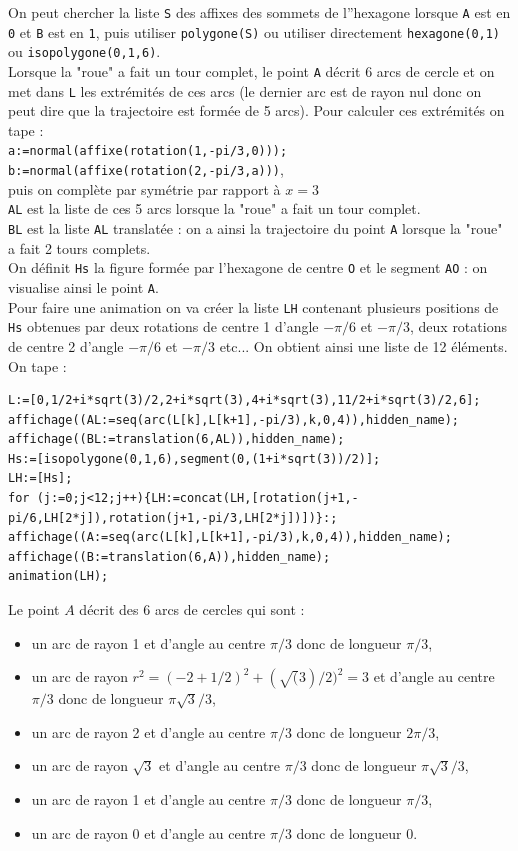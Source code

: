 \documentclass[a4paper,11pt]{book}
\begin{document}
On peut chercher la liste {\tt S} des affixes des sommets de l''hexagone
lorsque  {\tt A} est en {\tt 0} et {\tt B} est en {\tt 1}, puis utiliser
{\tt polygone(S)} ou utiliser directement {\tt hexagone(0,1)} ou
{\tt isopolygone(0,1,6)}.\\
Lorsque la "roue" a fait un tour complet, le point {\tt A} d\'ecrit 6 arcs de 
cercle et on met dans {\tt L} les extr\'emit\'es de ces arcs (le dernier arc 
est de rayon nul donc on peut dire que la trajectoire est form\'ee de 5 arcs). 
Pour calculer ces extr\'emit\'es on tape :\\
{\tt a:=normal(affixe(rotation(1,-pi/3,0)));}\\
{\tt b:=normal(affixe(rotation(2,-pi/3,a)))},\\
puis on compl\`ete par sym\'etrie par rapport \`a $x=3$\\
{\tt AL} est la liste de ces 5 arcs lorsque la "roue" a fait un tour complet.\\
{\tt BL} est la liste {\tt AL} translat\'ee : on a ainsi la trajectoire du 
point {\tt A} lorsque la "roue" a fait 2 tours complets.\\
On d\'efinit {\tt Hs} la figure form\'ee par l'hexagone de centre {\tt O}
et le segment {\tt AO} : on visualise ainsi le point {\tt A}.\\
Pour faire une animation on va cr\'eer la liste {\tt LH} contenant plusieurs 
positions de  {\tt Hs} obtenues par deux rotations de centre 1 d'angle $-\pi/6$
et $-\pi/3$, deux rotations de centre 2 d'angle $-\pi/6$ et $-\pi/3$ etc...
On obtient ainsi une liste de 12 \'el\'ements.\\
On tape :
\begin{verbatim}
L:=[0,1/2+i*sqrt(3)/2,2+i*sqrt(3),4+i*sqrt(3),11/2+i*sqrt(3)/2,6];
affichage((AL:=seq(arc(L[k],L[k+1],-pi/3),k,0,4)),hidden_name);
affichage((BL:=translation(6,AL)),hidden_name);
Hs:=[isopolygone(0,1,6),segment(0,(1+i*sqrt(3))/2)];
LH:=[Hs];
for (j:=0;j<12;j++){LH:=concat(LH,[rotation(j+1,-pi/6,LH[2*j]),rotation(j+1,-pi/3,LH[2*j])])}:;
affichage((A:=seq(arc(L[k],L[k+1],-pi/3),k,0,4)),hidden_name);
affichage((B:=translation(6,A)),hidden_name);
animation(LH);
\end{verbatim}
Le point $A$ d\'ecrit des 6 arcs de cercles qui sont :
\begin{itemize}
\item un arc de rayon 1 et d'angle au centre $\pi/3$ donc de longueur $\pi/3$, 
\item un arc de rayon $r^2=(-2+1/2)^2+(\sqrt(3)/2)^2=3$ et d'angle au centre 
$\pi/3$ donc de longueur $\pi\sqrt 3/3$, 
\item un arc de rayon 2 et d'angle au centre $\pi/3$ donc de longueur 
$2\pi/3$, 
\item un arc de rayon $\sqrt 3$ et d'angle au centre $\pi/3$ donc de 
longueur $\pi\sqrt 3/3$, 
\item un arc de rayon 1 et d'angle au centre $\pi/3$ donc de longueur $\pi/3$, 
\item un arc de rayon 0 et d'angle au centre $\pi/3$ donc de longueur $0$.
\end{itemize}
\end{document}
